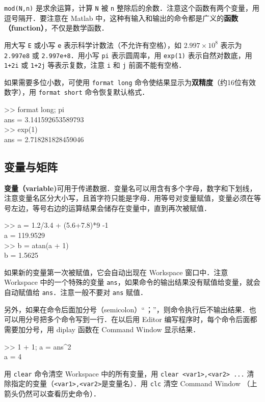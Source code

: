 \texttt{mod(N,n)} 是求余运算，计算 \texttt{N} 被 \texttt{n} 整除后的余数．注意这个函数有两个变量，用逗号隔开．要注意在 Matlab 中，这种有输入和输出的命令都是广义的\textbf{函数（function）}，不仅是数学函数．

用大写 \texttt{E} 或小写 \texttt{e} 表示科学计数法（不允许有空格），如 $2.997\times 10^8$ 表示为 \texttt{2.997e8} 或 \texttt{2.997e+8}．用小写 \texttt{pi} 表示圆周率，用 \texttt{exp(1)} 表示自然对数底，用 \texttt{1+2i} 或 \texttt{1+2j} 等表示复数，注意 \texttt{i} 和 \texttt{j} 前面不能有空格．

如果需要多位小数，可使用 \texttt{format long} 命令使结果显示为\textbf{双精度}（约16位有效数字），用 \texttt{format short} 命令恢复默认格式．
\begin{Command}
>> format long; pi \\
ans = 3.141592653589793 \\
>> exp(1) \\
ans = 2.718281828459046
\end{Command}

\subsection{变量与矩阵}
\textbf{变量（variable)}可用于传递数据．变量名可以用含有多个字母，数字和下划线，注意变量名区分大小写，且首字符只能是字母．用等号对变量赋值，变量必须在等号左边，等号右边的运算结果会储存在变量中，直到再次被赋值．
\begin{Command}
>> a = 1.2/3.4 + (5.6+7.8)*9 -1 \\
a = 119.9529 \\
>> b = atan(a + 1) \\
b = 1.5625
\end{Command}
如果新的变量第一次被赋值，它会自动出现在 Workspace 窗口中．注意 Workspace 中的一个特殊的变量 \texttt{ans}，如果命令的输出结果没有赋值给变量，就会自动赋值给 \texttt{ans}．注意一般不要对 \texttt{ans} 赋值．

另外，如果在命令后面加分号（semicolon）“\,；”，则命令执行后不输出结果．也可以用分号把多个命令写到一行．在以后用 Editor 编写程序时，每个命令后面都需要加分号，用 diplay 函数在 Command Window 显示结果．
\begin{Command}
>> 1 + 1; a = ans\^{}2 \\
a = 4
\end{Command}
用 \texttt{clear} 命令清空 Workspace 中的所有变量，用 \texttt{clear <var1>,<var2> ...} 清除指定的变量（\texttt{<var1>,<var2>}是变量名）．用 \texttt{clc} 清空 Command Window （上箭头仍然可以查看历史命令）．

